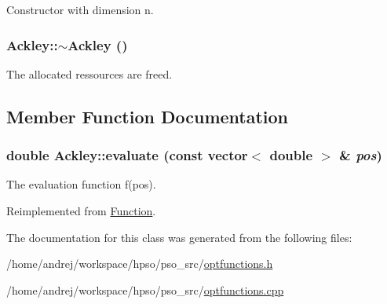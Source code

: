 Constructor with dimension n. 

\hypertarget{classAckley_744516ce25ffab41b589b7d39a52c380}{
\subsubsection{\setlength{\rightskip}{0pt plus 5cm}Ackley::$\sim$Ackley ()}}
\label{classAckley_744516ce25ffab41b589b7d39a52c380}


The allocated ressources are freed. 



\subsection{Member Function Documentation}
\hypertarget{classAckley_bfd43046b591f73cf05527333220b5e2}{
\subsubsection{\setlength{\rightskip}{0pt plus 5cm}double Ackley::evaluate (const vector$<$ double $>$ \& {\em pos})}}
\label{classAckley_bfd43046b591f73cf05527333220b5e2}


The evaluation function f(pos). 



Reimplemented from \hyperlink{classFunction_159260a1fc3afa8932491e4057b6b844}{Function}.

The documentation for this class was generated from the following files:\begin{CompactItemize}
\item 
/home/andrej/workspace/hpso/pso\_\-src/\hyperlink{optfunctions_8h}{optfunctions.h}\item 
/home/andrej/workspace/hpso/pso\_\-src/\hyperlink{optfunctions_8cpp}{optfunctions.cpp}\end{CompactItemize}
